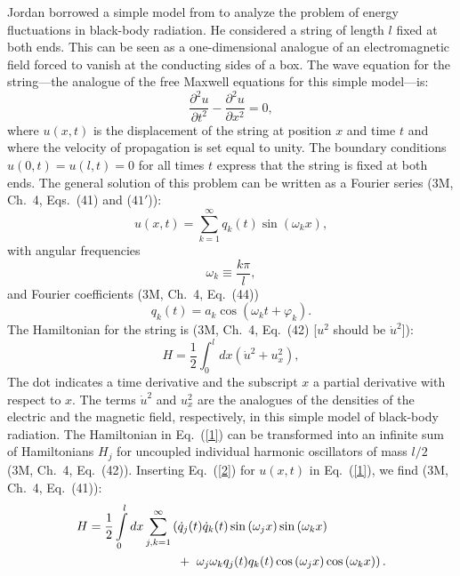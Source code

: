 \documentclass[12pt]{elsart}
\begin{document}
Jordan borrowed a simple model from \citet[pp.\ 367--373]{Ehrenfest 1925a} to analyze the problem of energy fluctuations in black-body radiation. He considered a string of length $l$ fixed at both ends.  This can be seen as a one-dimensional analogue of an electromagnetic field forced to vanish at the conducting sides of a box. The wave equation for the string---the analogue of the free Maxwell equations for this simple model---is:
\begin{equation}
\frac{\partial^2 u}{\partial t^2} - \frac{\partial^2 u}{\partial x^2} = 0,
\end{equation}
where $u(x, t)$ is the displacement of the string at position $x$ and time $t$ and where the velocity of propagation is set equal to unity. The boundary conditions $u(0,t) = u(l, t) = 0$ for all times $t$ express that the string is fixed at both ends.
The general solution of this problem can be written as a Fourier series (3M, Ch.\ 4, Eqs.\ (41) and ($41'$)):
\begin{equation}
u(x,t) = \sum_{k=1}^\infty q_k(t) \sin{(\omega_k x)},
\label{2}
\end{equation}
with angular frequencies
\begin{equation}
\omega_k \equiv  \frac{k \pi}{l},
\label{3a}
\end{equation}
and  Fourier coefficients (3M, Ch.\ 4, Eq.\ (44)) 
\begin{equation}
q_k(t) = a_k \cos{(\omega_k t + \varphi_k)}.
\label{3}
\end{equation}
The Hamiltonian for the string is (3M, Ch.\ 4, Eq.\ (42) [$u^2$ should be $\dot{u}^2$]):
\begin{equation}
H = \frac{1}{2} \int_0^l dx \left( \dot{u}^2 + u_x^2 \right), 
\label{1}
\end{equation}
The dot indicates a time derivative and the subscript $x$ a partial derivative with respect to $x$. The terms $\dot{u}^2$ and $u_x^2$ are the analogues of the densities of the electric and the magnetic field, respectively, in this simple model of  black-body radiation. 
The Hamiltonian in Eq.\ (\ref{1}) can be transformed into an infinite sum of Hamiltonians $H_j$ for uncoupled individual harmonic oscillators of mass $l/2$ (3M, Ch.\ 4, Eq.\ (42)). Inserting Eq.\ (\ref{2}) for $u(x,t)$ in Eq.\ (\ref{1}),
we find (3M, Ch.\ 4, Eq.\ (41)):
\begin{eqnarray}
\lefteqn{ H  =  \frac{1}{2} \int_0^l dx \sum_{j,k =1}^\infty \left(  \dot{q}_j(t) \dot{q}_k(t)
\sin{(\omega_j x)} \sin{(\omega_k x)}  \right.} \nonumber \\
 & & \;\;\;\;\;\;\;\;\;\;\;\;\;\;\;\;\;\;\;\;\;\;\;\;\;\;  \left.
 + \;\;  \omega_j \omega_k q_j(t) q_k(t) \cos{(\omega_j x)} \cos{(\omega_k x)} \right).
\label{3b}
\end{eqnarray}
\end{document}
